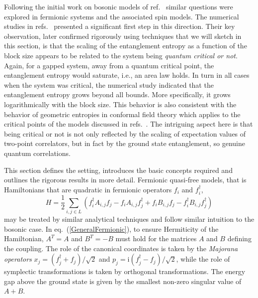 \documentclass[rmp,twocolumn,floatfix,epsfig,graphics]{revtex4} %
\newcommand{\mi}{\mathrm{i} }
\begin{document}
Following the initial work on bosonic models of ref.\ 
\cite{Harmonic} similar questions were explored in 
fermionic systems and the associated spin models.
The numerical studies in refs.\ \cite{Latorre1,Latorre2} 
presented a significant first step in this direction. 
Their key observation, later confirmed rigorously 
\cite{Korepin,Its,Keating} using techniques that we will 
sketch in this section, is that the scaling of the 
entanglement entropy as a function of the block size 
appears to be related to the system being {\it quantum critical 
or not}. Again, for a gapped system, away from a quantum 
critical point, the entanglement entropy would saturate, 
i.e., an area law holds. In turn in all cases when the system 
was critical, the numerical study indicated that the 
entanglement entropy grows beyond all bounds. More 
specifically, it grows logarithmically with the block 
size. This behavior is also consistent with the behavior of geometric entropies 
in conformal field theory \cite{Callan,Larsen} which applies to the critical
points of the models discussed in 
refs.\ \cite{Latorre1,Latorre2,CriticalKorepin,Franchini}. 
The intriguing aspect here is that being critical 
or not is not only reflected by the scaling of expectation 
values of two-point correlators, but in fact by the ground 
state entanglement, so genuine quantum correlations.

This section defines the setting, introduces the basic 
concepts required and outlines the rigorous results in
more detail. Fermionic quasi-free models, that is Hamiltonians 
that are quadratic in fermionic operators $f_i$ and $f_i^{\dagger}$, 
\begin{equation}\label{GeneralFermionic}
        H= \frac{1}{2}\sum_{i,j\in L}
        \left(
        f_i^\dagger A_{i,j} f_j
        - 
        f_i A_{i,j} f_j^\dagger
        +f_i B_{i,j} f_j
        -f_i^\dagger B_{i,j} f_j^\dagger
        \right)
\end{equation}
may be treated by similar analytical techniques and follow similar
intuition to the bosonic case. 
In eq.\ (\ref{GeneralFermionic}), to ensure Hermiticity of the
Hamiltonian, $A^T=A$ and $B^T=-B$ must hold for the matrices $A$ 
and $B$ defining the coupling. The role of the canonical coordinates
is taken by the {\it Majorana operators} $x_j = (f_j^\dagger+ f_j)/
\sqrt{2}$ and $p_j = \mi (f_j^\dagger - f_j)/\sqrt{2}$,
while the role of symplectic transformations is taken by 
orthogonal transformations. The energy gap above the ground state is given by
the smallest non-zero singular value of $A+B$. 
\end{document}
